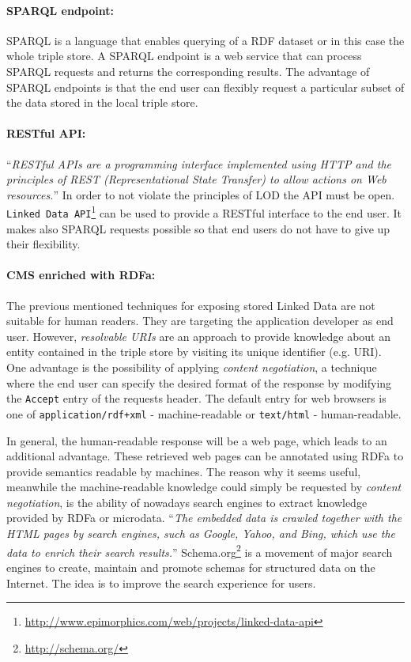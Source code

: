 \documentclass{article}
\begin{document}
\paragraph{SPARQL endpoint:} SPARQL is a language that enables querying of a RDF dataset or in this case the whole triple store. A SPARQL endpoint is a web service that can process SPARQL requests and returns the corresponding results. The advantage of SPARQL endpoints is that the end user can flexibly request a particular subset of the data stored in the local triple store.

\paragraph{RESTful API:} ``\textit{RESTful APIs are a programming interface implemented using HTTP and the principles of REST (Representational State Transfer) to allow actions on Web resources.}''\cite{hyland_linked_????}
In order to not violate the principles of LOD the API must be open. \texttt{Linked Data API}\footnote{\url{http://www.epimorphics.com/web/projects/linked-data-api}} can be used to provide a RESTful interface to the end user. It makes also SPARQL requests possible so that end users do not have to give up their flexibility.

\paragraph{CMS enriched with RDFa:} The previous mentioned techniques for exposing stored Linked Data are not suitable for human readers. They are targeting the application developer as end user. However, \textit{resolvable URIs} are an approach to provide knowledge about an entity contained in the triple store by visiting its unique identifier (e.g. URI). One advantage is the possibility of applying \textit{content negotiation}, a technique where the end user can specify the desired format of the response by modifying the \texttt{Accept} entry of the requests header. The default entry for web browsers is one of \texttt{application/rdf+xml} - machine-readable or \texttt{text/html} - human-readable. 

In general, the human-readable response will be a web page, which leads to an additional advantage. These retrieved web pages can be annotated using RDFa to provide semantics readable by machines. The reason why it seems useful, meanwhile the machine-readable knowledge could simply be requested by \textit{content negotiation}, is the ability of nowadays search engines to extract knowledge provided by RDFa or microdata. ``\textit{The embedded data is crawled together with the HTML pages by search engines, such as Google, Yahoo, and Bing, which use the data to enrich their search results.}''\cite{bizer_deployment_2013} Schema.org\footnote{\url{http://schema.org/}} is a movement of major search engines to create, maintain and promote schemas for structured data on the Internet. The idea is to improve the search experience for users.
\end{document}
